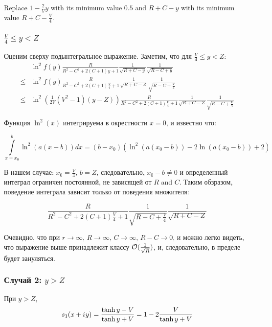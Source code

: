 Replace $1 - \frac{2}{V}y$ with its minimum value $0.5$ and $R + C - y$ with its minimum value $R + C - \frac{V}{4}$.


\subsubsection{$\frac{V}{4} \le y < Z$}

Оценим сверху подынтегральное выражение. Заметим, что для $\frac{V}{4} \le y < Z$:
\begin{align*}
    & \ln^2 f(y) \frac{R}{R^2 - C^2 + 2 (C + 1) y + 1} \frac{1}{\sqrt{R + C - y}} \frac{1}{\sqrt{R - C + y}} 
\\ \le & \ln^2 f(y) \frac{R}{R^2 - C^2 + 2 (C + 1) \frac{V}{4} + 1} \frac{1}{\sqrt{R + C - Z}} \frac{1}{\sqrt{R - C + \frac{V}{4}}}
\\ \le & \ln^2 \left( \frac{1}{2 V}(V^2 - 1) (y - Z) \right) \frac{R}{R^2 - C^2 + 2 (C + 1) \frac{V}{4} + 1} \frac{1}{\sqrt{R + C - Z}} \frac{1}{\sqrt{R - C + \frac{V}{4}}}
\end{align*}

Функция $\ln^2(x)$ интегрируема в окрестности $x = 0$, и известно что: %

\[
\int\limits_{x=x_0}^b \ln^2(a (x - b)) dx = (b - x_0) (\ln^2(a (x_0 - b)) - 2 \ln(a (x_0 - b)) + 2)
\]

В нашем случае: $x_0 = \frac{V}{4}$, $b = Z$, следовательно, $x_0 - b \ne 0$ и определенный интеграл ограничен постоянной, не зависящей от $R$ and $C$. Таким обзразом, поведение интеграла зависит только от поведения множителя:

\[
\frac{R}{R^2 - C^2 + 2 (C + 1) \frac{V}{4} + 1} \frac{1}{\sqrt{R - C + \frac{V}{4}}} \frac{1}{\sqrt{R + C - Z}}
\]

Очевидно, что при $r \to \infty$, $R \to \infty$, $C \to \infty$, $R - C \to 0$, и можно легко видеть, что выражение выше принадлежит классу $\mathcal{O}(\frac{1}{\sqrt{R}})$, и, следовательно, в пределе будет зануляться.

\subsubsection{Случай 2: $y > Z$}
При $y > Z$, 
\[
s_1(x + {i\mkern1mu} y) 
 = \frac{\tanh y - V}{\tanh y + V}
 = 1 - 2 \frac{V}{\tanh y + V}
\]

